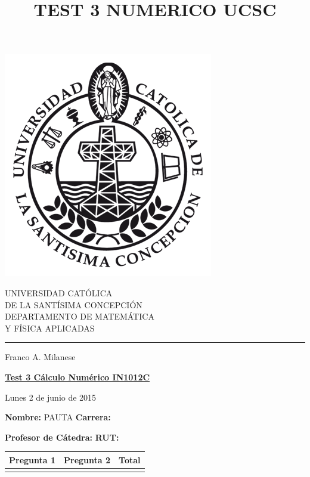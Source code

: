 \documentclass[11pt]{article}
\begin{document}
\title{TEST 3 NUMERICO UCSC}

\begin{minipage}{0.15\textwidth}
\includegraphics[width=\textwidth]{ucsc.png}
\end{minipage}
\begin{minipage}{0.9\textwidth}
{UNIVERSIDAD CAT\'OLICA}\\ 
{DE LA SANT\'ISIMA CONCEPCI\'ON}\\
{DEPARTAMENTO DE MATEM\'ATICA}\\ 
{ Y F\'ISICA APLICADAS}\\
\rule{0.66\textwidth}{.5pt} Franco A. Milanese
\end{minipage}

\vspace*{0.5cm} \centerline {\bf\underline{Test 3 C\'alculo Num\'erico IN1012C }}
\centerline{\textrm{Lunes 2 de junio de 2015}}  

\vspace{0.2cm}
\textbf{Nombre:} PAUTA \hspace{0.65\textwidth}\textbf{Carrera:}

\vspace{0.1cm}
\textbf{Profesor de C\'atedra:}\hspace{0.5\textwidth} \textbf{ RUT:}
 \begin{center}
 \begin{tabular}{||p{2cm}|p{2cm}|p{2cm}||}
 \hline
 Pregunta 1 &  Pregunta 2 &     Total\\
 \hline

  \vspace{1.5cm} & &       \\
 \hline
 \end{tabular}
 \end{center}
\end{document}
